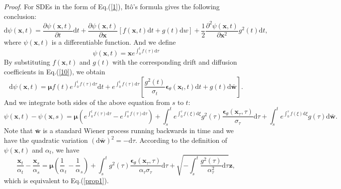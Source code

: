 \textit{Proof}. For SDEs in the form of Eq.(\ref{1}), Itô's formula gives the following conclusion:
\begin{equation}
    \mathrm{d}\psi(\boldsymbol{x},t)=\frac{\partial\psi(\boldsymbol{x},t)}{\partial t}\mathrm{d}t + \frac{\partial\psi(\boldsymbol{x},t)}{\partial \boldsymbol{x}}[f(\boldsymbol{x},t) \mathrm{d}t + g(t) \mathrm{d}w] + \frac12\frac{\partial^2\psi(\boldsymbol{x},t)}{\partial \boldsymbol{x}^2}g^2(t)\mathrm{d}t,
    \label{a1-1}
\end{equation}
where $\psi(\boldsymbol{x},t)$ is a differentiable function. And we define 
\begin{equation*}
    \psi(\boldsymbol{x},t)=\boldsymbol{x}e^{\int_0^tf(\tau)\mathrm{d}\tau}
\end{equation*}
By substituting $f(\boldsymbol{x},t)$ and $g(t)$ with the corresponding drift and diffusion coefficients in Eq.(\ref{10}), we obtain 
\begin{equation*}
\mathrm{d}\psi(\boldsymbol{x},t)=\boldsymbol{\mu}f(t)e^{\int_0^tf(\tau)\mathrm{d}\tau}\mathrm{d}t+e^{\int_0^tf(\tau)\mathrm{d}\tau}\left[ \frac{g^2(t)}{\sigma_t}\boldsymbol{\epsilon}_\theta(\boldsymbol{x}_t,t)\mathrm{d}t+g(t)\mathrm{d}\bar{\boldsymbol{w}}\right].
\end{equation*}
And we integrate both sides of the above equation from $s$ to $t$:
\begin{equation*}
\psi(\boldsymbol{x},t)-\psi(\boldsymbol{x},s)=\boldsymbol{\mu}(e^{\int_0^tf(\tau)\mathrm{d}\tau}-e^{\int_0^sf(\tau)\mathrm{d}\tau})
+\int_s^te^{\int_0^{\tau}f(\xi)\mathrm{d}\xi}g^2(\tau)\frac{\boldsymbol{\epsilon}_\theta(\boldsymbol{x}_\tau,\tau)}{\sigma_{\tau}}\mathrm{d}\tau
+\int_s^te^{\int_0^{\tau}f(\xi)\mathrm{d}\xi}g(\tau)\mathrm{d}\bar{\boldsymbol{w}}.
\end{equation*}
Note that $\bar{\boldsymbol{w}}$ is a standard Wiener process running backwards in time and we have the quadratic variation $(\mathrm{d}\bar{\boldsymbol{w}})^2=-\mathrm{d}\tau$. According to the definition of $\psi(\boldsymbol{x},t)$ and $\alpha_t$, we have
\begin{equation*}
\frac{\boldsymbol{x}_t}{\alpha_t}-\frac{\boldsymbol{x}_s}{\alpha_s}=\boldsymbol{\mu}\left(\frac1\alpha_t-\frac1\alpha_s\right)+\int_s^tg^2(\tau)\frac{\boldsymbol{\epsilon}_\theta(\boldsymbol{x}_\tau,\tau)}{\alpha_{\tau}\sigma_{\tau}}\mathrm{d}\tau
+\sqrt{-\int_s^t\frac{g^2(\tau)}{\alpha_{\tau}^2}\mathrm{d}\tau}\boldsymbol{z},
\end{equation*}
which is equivalent to Eq.(\ref{prop1}).

